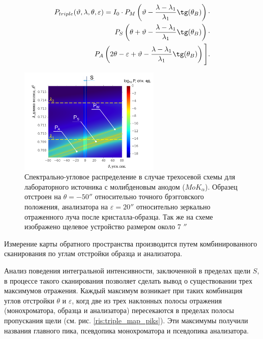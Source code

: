 \begin{eqnarray} \label{eq:triplr_spectra_angle_map}
  P_{triple}(\vartheta,\lambda,\theta,\varepsilon) =I_0\cdot
    P_M \left(\vartheta - \frac{\lambda - \lambda_1}{\lambda_1}\tg(\theta_B) \right) \cdot \nonumber \\
   P_S \left(\theta + \vartheta - \frac{\lambda - \lambda_1}{\lambda_1}\tg(\theta_B)\right)  \cdot  \nonumber \\
   P_A \left(2\theta - \varepsilon + \vartheta - \frac{\lambda - \lambda_1}{\lambda_1}\tg(\theta_B)\right) \Bigg].
 \end{eqnarray}

  \begin{figure}[H]
    \centering
    \includegraphics[width=0.6\textwidth]{images/triple_map.png}
    \caption{Спектрально-угловое распределение в случае трехосевой схемы
    для лабораторного источника с молибденовым анодом ($MoK_{\alpha}$).
    Образец отстроен на $\theta = - 50''$ относительно точного брэгговского положения,
    анализатора на $\varepsilon = 20''$ относительно
    зеркально отраженного луча после кристалла-образца. Так же на схеме изображено щелевое устройство размером около 7 $''$}
    \label{ris:triple_map}
  \end{figure}

Измерение карты обратного пространства производится путем комбинированного
сканирования по углам отстройки образца и анализатора.

Анализ поведения интегральной интенсивности, заключенной в пределах щели $S$,
в процессе такого сканирования позволяет сделать вывод о существовании трех
максимумов отражения. Каждый максимум возникает при таких комбинация углов отстройки
$\theta$ и $\varepsilon$, когд две из трех наклонных полосы отражения (монохроматора,
образца и анализатора) пересекаются в пределах полосы пропускания щели (см. рис. \ref{ris:triple_map_piks}).
Эти максимумы получили названия главного пика, псевдопика монохроматора и псевдопика анализатора.

